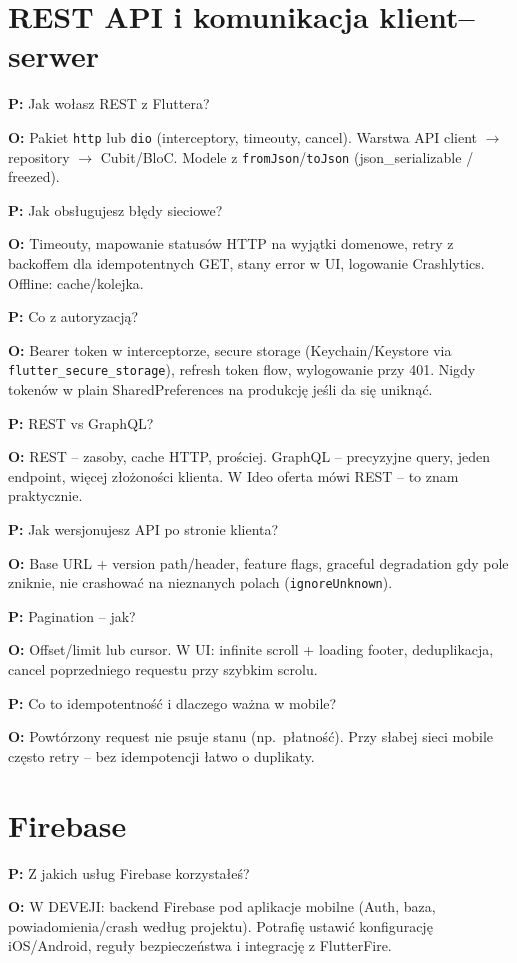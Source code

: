 \documentclass[11pt,a4paper]{article}
\newcommand{\pyt}[1]{\par\medskip\noindent\textbf{P:} #1\par}
\newcommand{\odp}[1]{\noindent\textbf{O:} #1\par}
\begin{document}
\section{REST API i komunikacja klient--serwer}

\pyt{Jak wołasz REST z Fluttera?}
\odp{Pakiet \texttt{http} lub \texttt{dio} (interceptory, timeouty, cancel). Warstwa API client $\to$ repository $\to$ Cubit/BloC. Modele z \texttt{fromJson}/\texttt{toJson} (json\_serializable / freezed).}

\pyt{Jak obsługujesz błędy sieciowe?}
\odp{Timeouty, mapowanie statusów HTTP na wyjątki domenowe, retry z backoffem dla idempotentnych GET, stany error w UI, logowanie Crashlytics. Offline: cache/kolejka.}

\pyt{Co z autoryzacją?}
\odp{Bearer token w interceptorze, secure storage (Keychain/Keystore via \texttt{flutter\_secure\_storage}), refresh token flow, wylogowanie przy 401. Nigdy tokenów w plain SharedPreferences na produkcję jeśli da się uniknąć.}

\pyt{REST vs GraphQL?}
\odp{REST -- zasoby, cache HTTP, prościej. GraphQL -- precyzyjne query, jeden endpoint, więcej złożoności klienta. W Ideo oferta mówi REST -- to znam praktycznie.}

\pyt{Jak wersjonujesz API po stronie klienta?}
\odp{Base URL + version path/header, feature flags, graceful degradation gdy pole zniknie, nie crashować na nieznanych polach (\texttt{ignoreUnknown}).}

\pyt{Pagination -- jak?}
\odp{Offset/limit lub cursor. W UI: infinite scroll + loading footer, deduplikacja, cancel poprzedniego requestu przy szybkim scrolu.}

\pyt{Co to idempotentność i dlaczego ważna w mobile?}
\odp{Powtórzony request nie psuje stanu (np.\ płatność). Przy słabej sieci mobile często retry -- bez idempotencji łatwo o duplikaty.}

\section{Firebase}

\pyt{Z jakich usług Firebase korzystałeś?}
\odp{W DEVEJI: backend Firebase pod aplikacje mobilne (Auth, baza, powiadomienia/crash według projektu). Potrafię ustawić konfigurację iOS/Android, reguły bezpieczeństwa i integrację z FlutterFire.}
\end{document}
